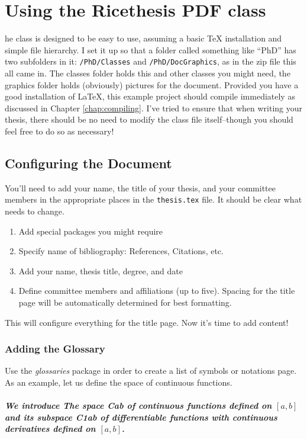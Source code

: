 \chapter{Using the Ricethesis PDF class}

he class is designed to be easy to use, assuming a basic TeX installation and simple file hierarchy.  I set it up so that a folder called something like ``PhD'' has two subfolders in it: \verb+/PhD/Classes+ and \verb+/PhD/DocGraphics+, as in the zip file this all came in.  The classes folder holds this and other classes you might need, the graphics folder holds (obviously) pictures for the document.  Provided you have a good installation of \LaTeX, this example project should compile immediately as discussed in Chapter \ref{chap:compiling}.  I've tried to ensure that when writing your thesis, there should be no need to modify the class file itself--though you should feel free to do so as necessary!

\section{Configuring the Document}

You'll need to add your name, the title of your thesis, and your committee members in the appropriate places in the \verb+thesis.tex+ file.  It should be clear what needs to change.

\begin{enumerate}
	\item Add special packages you might require
	\item Specify name of bibliography: References, Citations, etc.
	\item Add your name, thesis title, degree, and date
	\item Define committee members and affiliations (up to five).  Spacing for the title page will be automatically determined for best formatting.
\end{enumerate}

This will configure everything for the title page.  Now it's time to add content!

\subsection{Adding the Glossary}
Use the {\em glossaries} package in order to create a list of symbols or notations page.  As an example, let us define the space of continuous functions.

\paragraph
{\em
We introduce The space \gls{Cab} of continuous functions defined on $[a,b]$ and its subspace \gls{C1ab} of differentiable functions with continuous derivatives defined on $[a,b]$.
}

